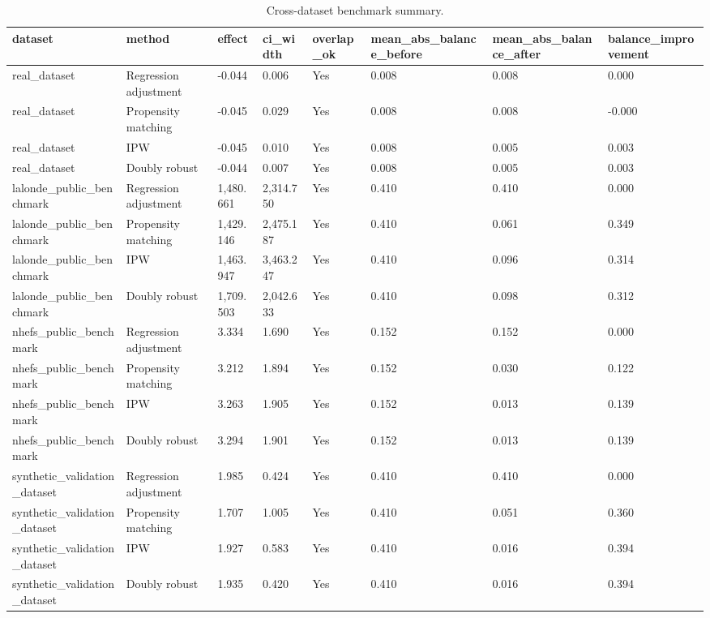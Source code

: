 \begin{table}
\caption{Cross-dataset benchmark summary.}
\label{tab:cross-dataset-benchmarks}
\begin{tabular}{llllllll}
\toprule
dataset & method & effect & ci_width & overlap_ok & mean_abs_balance_before & mean_abs_balance_after & balance_improvement \\
\midrule
real_dataset & Regression adjustment & -0.044 & 0.006 & Yes & 0.008 & 0.008 & 0.000 \\
real_dataset & Propensity matching & -0.045 & 0.029 & Yes & 0.008 & 0.008 & -0.000 \\
real_dataset & IPW & -0.045 & 0.010 & Yes & 0.008 & 0.005 & 0.003 \\
real_dataset & Doubly robust & -0.044 & 0.007 & Yes & 0.008 & 0.005 & 0.003 \\
lalonde_public_benchmark & Regression adjustment & 1,480.661 & 2,314.750 & Yes & 0.410 & 0.410 & 0.000 \\
lalonde_public_benchmark & Propensity matching & 1,429.146 & 2,475.187 & Yes & 0.410 & 0.061 & 0.349 \\
lalonde_public_benchmark & IPW & 1,463.947 & 3,463.247 & Yes & 0.410 & 0.096 & 0.314 \\
lalonde_public_benchmark & Doubly robust & 1,709.503 & 2,042.633 & Yes & 0.410 & 0.098 & 0.312 \\
nhefs_public_benchmark & Regression adjustment & 3.334 & 1.690 & Yes & 0.152 & 0.152 & 0.000 \\
nhefs_public_benchmark & Propensity matching & 3.212 & 1.894 & Yes & 0.152 & 0.030 & 0.122 \\
nhefs_public_benchmark & IPW & 3.263 & 1.905 & Yes & 0.152 & 0.013 & 0.139 \\
nhefs_public_benchmark & Doubly robust & 3.294 & 1.901 & Yes & 0.152 & 0.013 & 0.139 \\
synthetic_validation_dataset & Regression adjustment & 1.985 & 0.424 & Yes & 0.410 & 0.410 & 0.000 \\
synthetic_validation_dataset & Propensity matching & 1.707 & 1.005 & Yes & 0.410 & 0.051 & 0.360 \\
synthetic_validation_dataset & IPW & 1.927 & 0.583 & Yes & 0.410 & 0.016 & 0.394 \\
synthetic_validation_dataset & Doubly robust & 1.935 & 0.420 & Yes & 0.410 & 0.016 & 0.394 \\
\bottomrule
\end{tabular}
\end{table}
